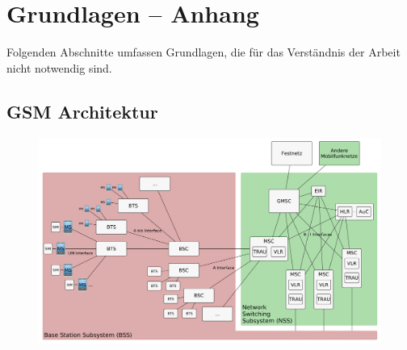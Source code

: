 \chapter{Grundlagen -- Anhang} \label{hdl:a_grundlagen}

Folgenden Abschnitte umfassen Grundlagen, die für das Verständnis der Arbeit nicht notwendig sind.

\section{GSM Architektur} \label{hdl:a_gsm_arch}

\begin{figure}[H]
	\centering \includegraphics[width=1.0\linewidth]{figures/gsm_network_architecture.pdf}
\end{figure}

